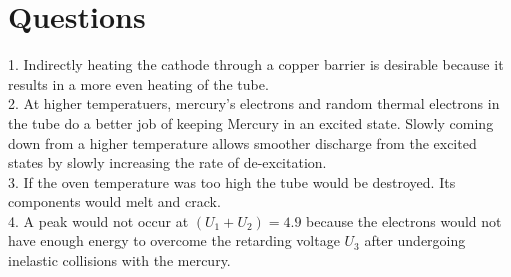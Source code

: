 \documentclass[12pt]{article}
\begin{document}
\section{Questions}
1. Indirectly heating the cathode through a copper barrier is desirable because it results in a more even heating of the tube. \\
2. At higher temperatuers, mercury's electrons and random thermal electrons in the tube do a better job of keeping Mercury in an excited state. Slowly coming down from a higher temperature allows smoother discharge from the excited states by slowly increasing the rate of de-excitation. \\
3. If the oven temperature was too high the tube would be destroyed. Its components would melt and crack. \\
4. A peak would not occur at $(U_1 + U_2) = 4.9$ because the electrons would not have enough energy to overcome the retarding voltage $U_3$ after undergoing inelastic collisions with the mercury.
\end{document}
